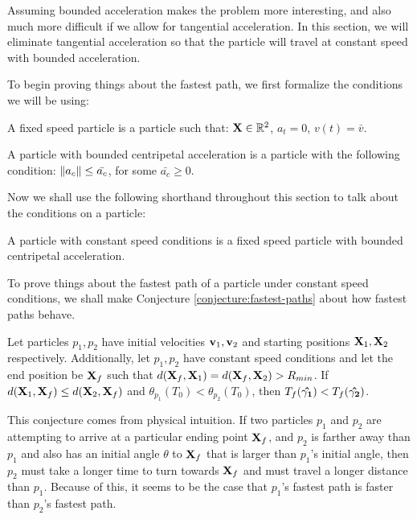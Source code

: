 Assuming bounded acceleration makes the problem more interesting, and also much more difficult if we allow for tangential acceleration. In this section, we will eliminate tangential acceleration so that the particle will travel at constant speed with bounded acceleration.

To begin proving things about the fastest path, we first formalize the conditions we will be using:

\begin{definition}
  A fixed speed particle is a particle such that: $\mathbf{X} \in \mathbb R^2$, $a_t = 0$, $v(t) = \bar{v}$.
\end{definition}

\begin{definition}
  A particle with bounded centripetal acceleration is a particle with the following condition: $\norm{a_c} \le \bar{a_c}$, for some $\bar{a_c} \ge 0$.
\end{definition}

Now we shall use the following shorthand throughout this section to talk about the conditions on a particle:

\begin{definition}
  A particle with constant speed conditions is a fixed speed particle with bounded centripetal acceleration.
\end{definition}

To prove things about the fastest path of a particle under constant speed conditions, we shall make Conjecture \ref{conjecture:fastest-paths} about how fastest paths behave.

\begin{conjecture}
  \label{conjecture:fastest-paths}
  Let particles $p_1, p_2$ have initial velocities $\mathbf{v}_1, \mathbf{v}_2$ and starting positions $\mathbf{X}_1, \mathbf{X}_2$ respectively. Additionally, let $p_1, p_2$ have constant speed conditions and let the end position be $\mathbf{X}_f$ such that $d(\mathbf{X}_f, \mathbf{X}_1) = d(\mathbf{X}_f, \mathbf{X}_2) > R_{min}$. If $d(\mathbf{X}_1, \mathbf{X}_f) \leq d(\mathbf{X}_2, \mathbf{X}_f)$ and $\theta_{p_1}(T_0) < \theta_{p_2}(T_0)$, then $T_f(\mathbf{\hat{\gamma_1}}) < T_f(\mathbf{\hat{\gamma_2}})$.
\end{conjecture}

This conjecture comes from physical intuition. If two particles $p_1$ and $p_2$ are attempting to arrive at a particular ending point $\mathbf{X}_f$, and $p_2$ is farther away than $p_1$ and also has an initial angle $\theta$ to $\mathbf{X}_f$ that is larger than $p_1$'s initial angle, then $p_2$ must take a longer time to turn towards $\mathbf{X}_f$ and must travel a longer distance than $p_1$. Because of this, it seems to be the case that $p_1$'s fastest path is faster than $p_2$'s fastest path.


